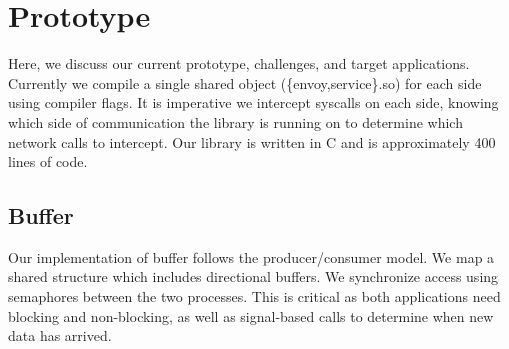 \section{Prototype}
\label{sec:prototype}
Here, we discuss our current prototype, challenges, and target applications.
Currently we compile a single shared object (\{envoy,service\}.so) for each side using compiler flags.
It is imperative we intercept syscalls on each side, knowing which side of communication the library is running on to determine which network calls to intercept.
Our library is written in C and is approximately 400 lines of code.

\subsection{\sysname Buffer}
Our implementation of \sysname buffer follows the producer/consumer model.
We map a shared structure which includes directional buffers.
We synchronize access using semaphores between the two processes.
This is critical as both applications need blocking and non-blocking, as well as signal-based calls to determine when new data has arrived.

\begin{table}[!ht]
    \begin{center}
        \caption{Library Functions Linked (HTTP only)}
        \label{t:libraries}
    \end{center}
\end{table}

